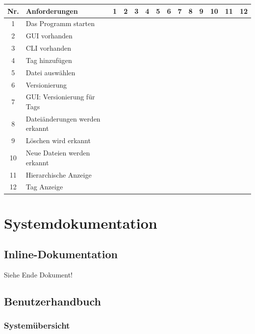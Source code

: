 \documentclass[10pt,paper=a4,final]{scrartcl}
\begin{document}
\begin{tabularx}{\textwidth}{|c|X|c|c|c|c|c|c|c|c|c|c|c|c|}
  \hline
  \bf Nr. & \bf Anforderungen &\bf 1 &\bf 2 &\bf 3 &\bf 4 &\bf 5 &\bf 6 &\bf 7 &\bf 8 &\bf 9 &\bf 10 &\bf 11 &\bf 12 \\ \hline
  1 & Das Programm starten & \cellcolor[gray]{0.7} & & & & & & & & & & & \\ \hline
  2 & GUI vorhanden & & & & & & & & \cellcolor[gray]{0.7} &\cellcolor[gray]{0.7} &\cellcolor[gray]{0.7} &\cellcolor[gray]{0.7} & \\ \hline
  3 & CLI vorhanden & & & &\cellcolor[gray]{0.7} & & & & & & & & \\ \hline
  4 & Tag hinzuf\"ugen & & & &\cellcolor[gray]{0.7} &\cellcolor[gray]{0.7} & & & &\cellcolor[gray]{0.7} & & & \\ \hline
  5 & Datei ausw\"ahlen & & & & & & \cellcolor[gray]{0.7} & & & & & & \cellcolor[gray]{0.7} \\ \hline
  6 & Versionierung & & \cellcolor[gray]{0.7} & & & & \cellcolor[gray]{0.7} & \cellcolor[gray]{0.7} & & & & & \cellcolor[gray]{0.7} \\ \hline
  7 & GUI: Versionierung f\"ur Tags & & & & & & & & \cellcolor[gray]{0.7} & & & & \\ \hline
  8 & Datei\"anderungen werden erkannt & & & & & & & & \cellcolor[gray]{0.7} & & & & \\ \hline
  9 & L\"oschen wird erkannt & & & & & & & & \cellcolor[gray]{0.7} & & & & \\ \hline
  10 & Neue Dateien werden erkannt & & & & & & & & \cellcolor[gray]{0.7} & & & & \\ \hline
  11 & Hierarchische Anzeige & & & & & & & & & & & \cellcolor[gray]{0.7} & \\ \hline
  12 & Tag Anzeige & & & & & & & & & \cellcolor[gray]{0.7} & & & \\ \hline
\end{tabularx}
\section{Systemdokumentation}
\subsection{Inline-Dokumentation}
Siehe Ende Dokument!
\subsection{Benutzerhandbuch}
\subsubsection{System\"ubersicht}
\end{document}
